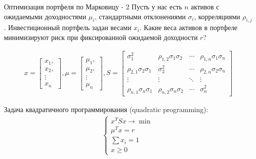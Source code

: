 \documentclass{beamer}
\begin{document}
\begin{frame}{Оптимизация портфеля по Марковицу - 2}
\justify
Пусть у нас есть $n$ активов с ожидаемыми доходностями $\mu_i$, стандартными отклонениями $\sigma_i$, корреляциями $\rho_{i,j}$. Инвестиционный портфель задан весами $x_i$. Какие веса активов в портфеле минимизируют риск при фиксированной ожидаемой доходности $r$?

\begin{align*}
x = \begin{bmatrix}
x_1, \\
x_2, \\
\vdots \\
x_n
\end{bmatrix},
\mu = \begin{bmatrix}
\mu_1, \\
\mu_2, \\
\vdots \\
\mu_n
\end{bmatrix},
S = \begin{bmatrix}
\sigma_1^2 & \rho_{1,2}\sigma_1\sigma_2 & \cdots & \rho_{1,n}\sigma_1\sigma_n \\
\rho_{2,1}\sigma_2\sigma_1 & \sigma_2^2 & \cdots & \rho_{2,n}\sigma_2\sigma_n \\
\vdots & \vdots & \ddots & \vdots \\
\rho_{n,1}\sigma_n\sigma_1 & \rho_{n,2}\sigma_n\sigma_2 & \cdots & \sigma_n^2
\end{bmatrix}
\end{align*}

Задача квадратичного программирования (quadratic programming):
\begin{align*}
\begin{cases}
x^TS x \to \min \\
\mu^Tx = r \\
\sum x_i = 1 \\
x \ge 0
\end{cases}
\end{align*}
\end{frame}



\newcommand{\drawAssetNode}[3]{
    \node[
        circle,
        fill,
        inner sep=2pt
    ] at (axis cs: #1, #2) {};
    \node[
        anchor=north
    ]
    at (axis cs: #1, #2)
    {\scriptsize #3};
}

\newcommand{\drawPortfolioNode}[8]{
    \node[
        anchor=#8,
        inner sep=1pt
    ] at (axis cs: #1, #2) {
    	  \setlength\tabcolsep{2pt}
	     \scriptsize
	     \begin{tabular}{|l|r|}
		  \hline
		  \multicolumn{2}{|c|}{#3} \\ \hline
		  Акц. & #4\% \\
		  Обл. & #5\% \\
		  Нед. & #6\%  \\
		  Зол. & #7\% \\
		  \hline
		  \end{tabular}
    };
	 
	 \node[
	     circle,
	     fill,
	     inner sep=2pt,
	     color=Set1-B
    ] at (axis cs:#1, #2) {};
}
\end{document}
